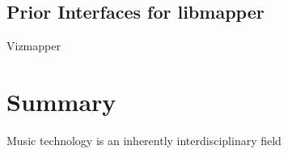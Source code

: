 \subsection{Prior Interfaces for libmapper} \label{sec:priorGUIs}
	Vizmapper 


\section{Summary}

Music technology is an inherently interdisciplinary field
	